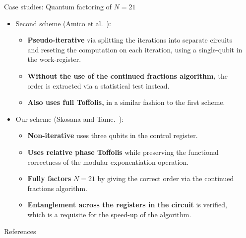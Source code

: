 \documentclass[final]{beamer}
\newlength{\sepwidth}
\newlength{\colwidth}
\newcommand{\separatorcolumn}{\begin{column}{\sepwidth}\end{column}}
\begin{document}
\begin{frame}[t]
\begin{columns}[t]
\begin{column}{\colwidth}
\begin{block}{Case studies: Quantum factoring of $N=21$}
                \begin{itemize}
                    \item Second scheme (Amico et al.~\cite{PhysRevA.100.012305}):
                        \begin{itemize}
                            \item \textbf{Pseudo-iterative} via splitting the iterations into separate circuits and reseting the computation on each iteration, using a single-qubit in the work-register.
                            \item \textbf{Without the use of the continued fractions algorithm,} the order is extracted via a statistical test instead.
                            \item \textbf{Also uses full Toffolis,}  in a similar fashion to the first scheme.
                        \end{itemize}

                \end{itemize}

                \begin{itemize}
                    \item Our scheme (Skosana and Tame.~\cite{skosana2021demonstration}):
                        \begin{itemize}
                            \item \textbf{Non-iterative} uses three qubits in the control register.
                            \item  \textbf{Uses relative phase Toffolis} while preserving the functional correctness of the modular exponentiation operation.
                            \item \textbf{Fully factors} $N=21$ by giving the correct order via the continued fractions algorithm.
                            \item \textbf{Entanglement across the registers in the circuit} is verified, which is a requisite for the speed-up of the algorithm.
                        \end{itemize}
                \end{itemize}
               \end{block}

               \begin{block}{References}
                    
                    \nocite{*}
                    
               \end{block}
            \end{column}
            \separatorcolumn
        \end{columns}
    \end{frame}
\end{document}
